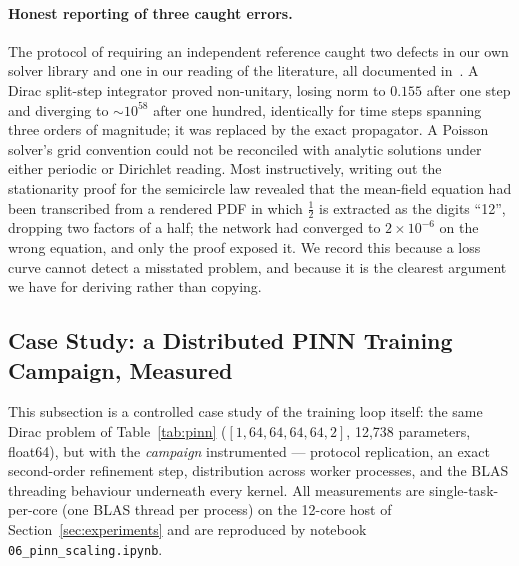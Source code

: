 \documentclass[11pt,a4paper]{article}
\theoremstyle{plain}
\theoremstyle{definition}
\begin{document}
\paragraph{Honest reporting of three caught errors.} The protocol of requiring
an independent reference caught two defects in our own solver library and one
in our reading of the literature, all documented
in~\cite{alvarez2026pinn}. A Dirac split-step integrator proved non-unitary,
losing norm to $0.155$ after one step and diverging to $\sim10^{58}$ after one
hundred, identically for time steps spanning three orders of magnitude; it was
replaced by the exact propagator. A Poisson solver's grid convention could not
be reconciled with analytic solutions under either periodic or Dirichlet
reading. Most instructively, writing out the stationarity proof for the
semicircle law revealed that the mean-field equation had been transcribed from
a rendered PDF in which $\tfrac12$ is extracted as the digits ``12'', dropping
two factors of a half; the network had converged to $2\times10^{-6}$ on the
wrong equation, and only the proof exposed it. We record this because a loss
curve cannot detect a misstated problem, and because it is the clearest
argument we have for deriving rather than copying.

\subsection{Case Study: a Distributed PINN Training Campaign, Measured}
\label{sec:case-study}

This subsection is a controlled case study of the training loop itself:
the same Dirac problem of Table~\ref{tab:pinn} ($[1,64,64,64,64,2]$, 12{,}738
parameters, float64), but with the \emph{campaign} instrumented --- protocol
replication, an exact second-order refinement step, distribution across
worker processes, and the BLAS threading behaviour underneath every kernel.
All measurements are single-task-per-core (one BLAS thread per process) on
the 12-core host of Section~\ref{sec:experiments} and are reproduced by
notebook \texttt{06\_pinn\_scaling.ipynb}.
\end{document}
